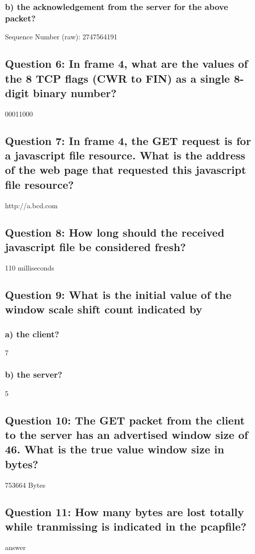 \documentclass[11pt, oneside, a4paper]{article}
\begin{document}
  \subsubsection*{b) the acknowledgement from the server for the above packet?}
  Sequence Number (raw): 2747564191

\subsection*{Question 6: In frame 4, what are the values of the 8 TCP flags (CWR to FIN) as a single 8-digit binary number?}
00011000

\subsection*{Question 7: In frame 4, the GET request is for a javascript file resource. What is the address of the web page that requested this javascript file resource?}
http://a.bcd.com

\subsection*{Question 8: How long should the received javascript file be considered fresh?}
110 milliseconds

\subsection*{Question 9: What is the initial value of the window scale shift count indicated by}
    \subsubsection*{a) the client?}
    7

    \subsubsection*{b) the server?}
    5

\subsection*{Question 10: The GET packet from the client to the server has an advertised window size of 46. What is the true value window size in bytes?}
753664 Bytes

\subsection*{Question 11: How many bytes are lost totally while tranmissing is indicated in the pcapfile?}
answer
\end{document}
